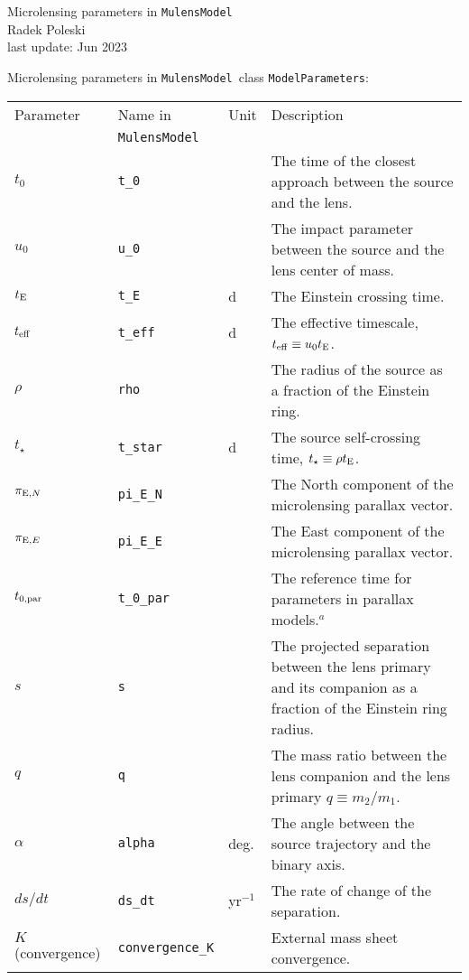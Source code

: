 \documentclass[12pt]{article}
\newcommand\MM{{\tt MulensModel}}
\begin{document}

\begin{center}
{\LARGE Microlensing parameters in \MM}\\
\bigskip
Radek Poleski\\
last update: Jun 2023
\end{center}

\bigskip
Microlensing parameters in \MM\, class {\tt ModelParameters}:

\begin{table*}[!h]
\begin{tabular}{l l l p{10cm}}
Parameter & Name in &  Unit & Description \\
 & \MM &  & \\
\hline
$t_0$ & {\tt t\_0} & & The time of the closest approach between the source and the lens. \\
$u_0$ & {\tt u\_0} & & The impact parameter between the source and the lens center of mass. \\
$t_{\rm E}$ & {\tt t\_E} & d & The Einstein crossing time. \\
$t_{\rm eff}$ & {\tt t\_eff} & d & The effective timescale, $t_{\rm eff} \equiv u_0 t_{\rm E}$. \\
$\rho$ & {\tt rho} & & The radius of the source as a fraction of the Einstein ring. \\
$t_{\star}$ & {\tt t\_star} & d & The source self-crossing time, $t_\star \equiv \rho t_{\rm E}$. \\
$\pi_{{\rm E}, N}$ & {\tt pi\_E\_N} & & The North component of the microlensing parallax vector. \\
$\pi_{{\rm E}, E}$ & {\tt pi\_E\_E} & & The East component of the microlensing parallax vector. \\
$t_{0,{\rm par}}$ & {\tt t\_0\_par} & & The reference time for parameters in parallax models.$^a$ \\
$s$ & {\tt s} & & The projected separation between the lens primary and its companion as a fraction of the Einstein ring radius. \\
$q$ & {\tt q} & & The mass ratio between the lens companion and the lens primary $q \equiv m_2/m_1$. \\
$\alpha$ & {\tt alpha} & deg. & The angle between the source trajectory and the binary axis. \\
$ds/dt$ & {\tt ds\_dt} & yr$^{-1}$ & The rate of change of the separation. \\
$K$ (convergence) & {\tt convergence\_K} & & External mass sheet convergence. \\

\end{tabular}
\end{table*}
\end{document}
